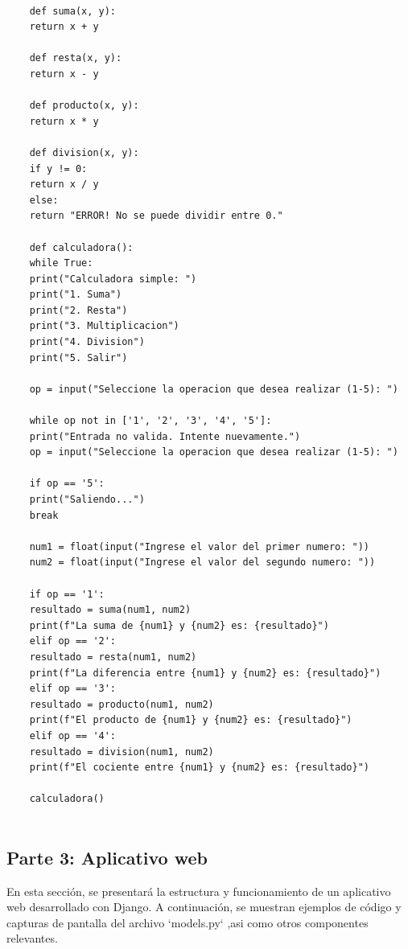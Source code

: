 \documentclass[12pt, a4paper]{article}
\begin{document}
\begin{verbatim}
	
	def suma(x, y):
	return x + y
	
	def resta(x, y):
	return x - y
	
	def producto(x, y):
	return x * y
	
	def division(x, y):
	if y != 0:
	return x / y
	else:
	return "ERROR! No se puede dividir entre 0."
	
	def calculadora():
	while True:
	print("Calculadora simple: ")
	print("1. Suma")
	print("2. Resta")
	print("3. Multiplicacion")
	print("4. Division")
	print("5. Salir")
	
	op = input("Seleccione la operacion que desea realizar (1-5): ")
	
	while op not in ['1', '2', '3', '4', '5']:
	print("Entrada no valida. Intente nuevamente.")
	op = input("Seleccione la operacion que desea realizar (1-5): ")
	
	if op == '5':
	print("Saliendo...")
	break
	
	num1 = float(input("Ingrese el valor del primer numero: "))
	num2 = float(input("Ingrese el valor del segundo numero: "))
	
	if op == '1':
	resultado = suma(num1, num2)
	print(f"La suma de {num1} y {num2} es: {resultado}")
	elif op == '2':
	resultado = resta(num1, num2)
	print(f"La diferencia entre {num1} y {num2} es: {resultado}")
	elif op == '3':
	resultado = producto(num1, num2)
	print(f"El producto de {num1} y {num2} es: {resultado}")
	elif op == '4':
	resultado = division(num1, num2)
	print(f"El cociente entre {num1} y {num2} es: {resultado}")
	
	calculadora()
	
\end{verbatim}


\subsection*{Parte 3: Aplicativo web}

En esta sección, se presentará la estructura y funcionamiento de un aplicativo web desarrollado con Django. A continuación, se muestran ejemplos de código y capturas de pantalla del archivo `models.py` ,asi como otros componentes relevantes.
\end{document}
